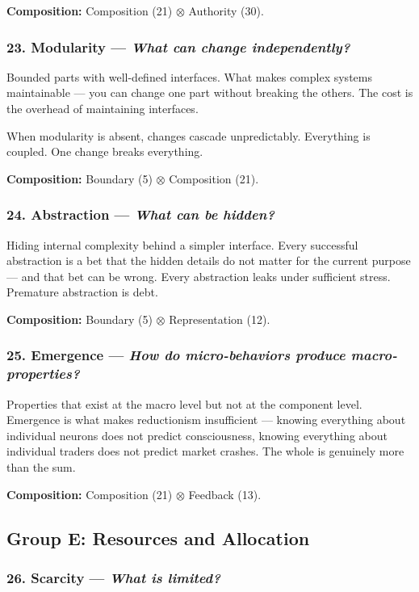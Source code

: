 \documentclass[11pt,a4paper]{article}
\newcommand{\question}[1]{\textit{#1}}
\newcommand{\comp}{\mathbin{\otimes}}
\begin{document}
\textbf{Composition:} Composition (21) $\comp$ Authority (30).

\subsubsection{23. Modularity --- \question{What can change independently?}}

Bounded parts with well-defined interfaces. What makes complex systems maintainable --- you can change one part without breaking the others. The cost is the overhead of maintaining interfaces.

When modularity is absent, changes cascade unpredictably. Everything is coupled. One change breaks everything.

\textbf{Composition:} Boundary (5) $\comp$ Composition (21).

\subsubsection{24. Abstraction --- \question{What can be hidden?}}

Hiding internal complexity behind a simpler interface. Every successful abstraction is a bet that the hidden details do not matter for the current purpose --- and that bet can be wrong. Every abstraction leaks under sufficient stress. Premature abstraction is debt.

\textbf{Composition:} Boundary (5) $\comp$ Representation (12).

\subsubsection{25. Emergence --- \question{How do micro-behaviors produce macro-properties?}}

Properties that exist at the macro level but not at the component level. Emergence is what makes reductionism insufficient --- knowing everything about individual neurons does not predict consciousness, knowing everything about individual traders does not predict market crashes. The whole is genuinely more than the sum.

\textbf{Composition:} Composition (21) $\comp$ Feedback (13).

\subsection{Group E: Resources and Allocation}

\subsubsection{26. Scarcity --- \question{What is limited?}}
\end{document}
